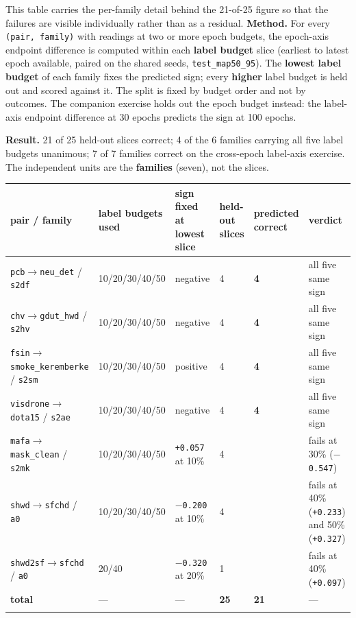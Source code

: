 \documentclass[pdflatex,sn-mathphys-ay]{sn-jnl}
\begin{document}
This table carries the per-family detail behind the 21-of-25 figure so that the failures are visible individually rather than as a residual. \textbf{Method.} For every \texttt{(pair, family)} with readings at two or more epoch budgets, the epoch-axis endpoint difference is computed within each \textbf{label budget} slice (earliest to latest epoch available, paired on the shared seeds, \texttt{test\_map50\_95}). The \textbf{lowest label budget} of each family fixes the predicted sign; every \textbf{higher} label budget is held out and scored against it. The split is fixed by budget order and not by outcomes. The companion exercise holds out the epoch budget instead: the label-axis endpoint difference at 30 epochs predicts the sign at 100 epochs.

\textbf{Result.} 21 of 25 held-out slices correct; 4 of the 6 families carrying all five label budgets unanimous; 7 of 7 families correct on the cross-epoch label-axis exercise. The independent units are the \textbf{families} (seven), not the slices.

{\footnotesize
\setlength{\tabcolsep}{4pt}
\begin{longtable}{p{}p{}p{}p{}>{\raggedleft\arraybackslash}p{}>{\raggedleft\arraybackslash}p{}}
\toprule
pair / family & label budgets used & sign fixed at lowest slice & \textbf{held-out slices} & \textbf{predicted correct} & verdict \\
\midrule
\endhead
\texttt{pcb\ensuremath{\rightarrow}neu\_det} / \texttt{s2df} & 10/20/30/40/50 & negative & 4 & \textbf{4} & all five same sign \\
\texttt{chv\ensuremath{\rightarrow}gdut\_hwd} / \texttt{s2hv} & 10/20/30/40/50 & negative & 4 & \textbf{4} & all five same sign \\
\texttt{fsin\ensuremath{\rightarrow}smoke\_keremberke} / \texttt{s2sm} & 10/20/30/40/50 & positive & 4 & \textbf{4} & all five same sign \\
\texttt{visdrone\ensuremath{\rightarrow}dota15} / \texttt{s2ae} & 10/20/30/40/50 & negative & 4 & \textbf{4} & all five same sign \\
\texttt{mafa\ensuremath{\rightarrow}mask\_clean} / \texttt{s2mk} & 10/20/30/40/50 & \texttt{+0.057} at 10\% & 4 & 3 & fails at 30\% (\texttt{\ensuremath{-}0.547}) \\
\texttt{shwd\ensuremath{\rightarrow}sfchd} / \texttt{a0} & 10/20/30/40/50 & \texttt{\ensuremath{-}0.200} at 10\% & 4 & 2 & fails at 40\% (\texttt{+0.233}) and 50\% (\texttt{+0.327}) \\
\texttt{shwd2sf\ensuremath{\rightarrow}sfchd} / \texttt{a0} & 20/40 & \texttt{\ensuremath{-}0.320} at 20\% & 1 & 0 & fails at 40\% (\texttt{+0.097}) \\
\textbf{total} & --- & --- & \textbf{25} & \textbf{21} & --- \\
\botrule
\end{longtable}}
\end{document}
